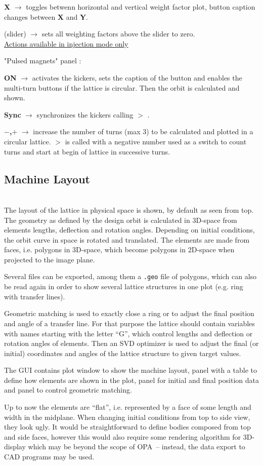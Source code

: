 \documentclass[12pt]{article}
\newcommand\code[1]{{\tt #1}}
\newcommand{\ofld}[1]{\colorbox{black!15}{{{\color{black}\bf #1}}}}
\newcommand{\ofldx}[1]{\colorbox{black!15}{{\color{black}(#1)}}}
\newcommand\guico[1]{{\color{blue}\code{#1}}}
\newcommand{\unico}[1]{{\color{burntorange}\code{#1}}}
\newcommand{\evcod}[2]{\ofld{#1} $\rightarrow$ \guico{#2}}
\newcommand{\evcodx}[2]{\ofldx{#1} $\rightarrow$ \guico{#2}}
\newcommand{\prcod}[2]{\opauni{#1}$>$\unico{#2}}
\newcommand{\opagui}[1]{\colorbox{blue!20}{{\color{black}\code{#1}}}}
\newcommand{\oguih}[2]{\subsection{\label{#2}#1}{\Huge\opagui{#2}}\\}
\newcommand{\opauni}[1]{\colorbox{orange!30}{{\color{black}\code{#1}}}}
\newcommand{\desc}[1]{#1}
\newcommand{\todo}[1]{{\color{red} #1}}
\begin{document}
\evcod{X}{butOcoWplotClick} toggles betwenn horizontal and vertical weight factor plot, button caption changes between \ofld{X} and \ofld{Y}.

\evcodx{slider}{sliderWChange} sets all weighting factors above the slider to zero.\\[1ex]



\underline{Actions available in injection mode only}

"Pulsed magnets" panel \guico{pankick}:

\evcod{ON}{butKickClick} activates the kickers, sets the caption of the button and enables the multi-turn buttons if the lattice is circular. Then the orbit is calculated and shown.

\evcod{Sync}{butSyncClick} synchronizes the kickers calling \prcod{georblib}{SyncKickers} .

\evcod{$-$,$+$}{butKickT(m,p)Click} increase the number of turns (max 3) to be calculated and plotted in a circular lattice. \prcod{linoplib}{OrbitCalc} is called with a negative number used as a switch to count turns and start at begin of lattice in successive turns.

\oguih{Machine Layout}{opageometry}

\desc{
The layout of the lattice in physical space is shown, by default as seen from top. The geometry as defined by the design orbit is calculated in 3D-space from elements lengths, deflection and rotation angles. Depending on initial conditions, the orbit curve in space is rotated and translated. The elements are made from faces, i.e. polygons in 3D-space, which become polygons in 2D-space when projected to the image plane.

Several files can be exported, among them a \code{.geo} file of polygons, which can also be read again in order to show several lattice structures in one plot (e.g. ring with transfer lines).

Geometric matching is used to exactly close a ring or to adjust the final position and angle of a transfer line. For that purpose the lattice should contain variables with names starting with the letter ``G'', which control lengths and deflection or rotation angles of elements. Then an SVD optimizer is used to adjust the final (or initial) coordinates and angles of the lattice structure to given target values.

The GUI contains plot window \guico{geo} to show the machine layout, panel \guico{PanParam} with a table to define how elements are shown in the plot, panel \guico{PanGeo} for initial and final position data and panel \guico{PanMat} to control geometric matching.

\todo{Up to now the elements are ``flat'', i.e. represented by a face of some length and width in the midplane. When changing initial conditions from top to side view, they look ugly. It would be straightforward to define bodies composed from top and side faces, however this would also require some rendering algorithm for 3D-display which may be beyond the scope of OPA~-- instead, the data export to CAD programs may be used.
}
}
\end{document}
